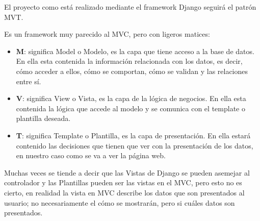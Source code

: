 El proyecto como está realizado mediante el framework Django seguirá el patrón MVT\cite{MVT}.

Es un framework muy parecido al MVC, pero con ligeros matices:
\begin{itemize}
	\item \textbf{M}: significa Model o Modelo, es la capa que tiene acceso a la base de datos. En ella esta contenida la información relacionada con los datos, es decir, cómo acceder a ellos, cómo se comportan, cómo se validan y las relaciones entre sí.
	\item \textbf{V}: significa View o Vista, es la capa de la lógica de negocios. En ella esta contenida la lógica que accede al modelo y se comunica con el template o plantilla deseada. 
	\item \textbf{T}: significa Template o Plantilla, es la capa de presentación. En ella estará contenido las decisiones que tienen que ver con la presentación de los datos, en nuestro caso como se va a ver la página web.
\end{itemize}

Muchas veces se tiende a decir que las Vistas de Django se pueden asemejar al controlador y las Plantillas pueden ser las vistas en el MVC, pero esto no es cierto, en realidad la vista en MVC describe los datos que son presentados al usuario; no necesariamente el cómo se mostrarán, pero si cuáles datos son presentados.
